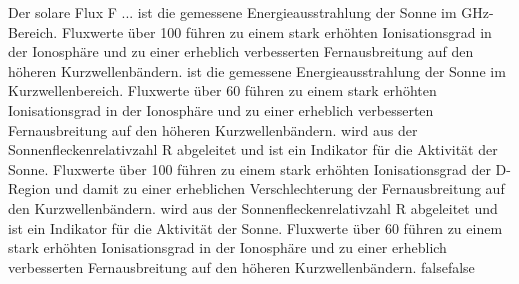     {Der solare Flux F ...}
    {ist die gemessene Energieausstrahlung der Sonne im GHz-Bereich. Fluxwerte über 100 führen zu einem stark erhöhten Ionisationsgrad in der Ionosphäre und zu einer erheblich verbesserten Fernausbreitung auf den höheren Kurzwellenbändern.}
    {ist die gemessene Energieausstrahlung der Sonne im Kurzwellenbereich. Fluxwerte über 60 führen zu einem stark erhöhten Ionisationsgrad in der Ionosphäre und zu einer erheblich verbesserten Fernausbreitung auf den höheren Kurzwellenbändern.}
    {wird aus der Sonnenfleckenrelativzahl R abgeleitet und ist ein Indikator für die Aktivität der Sonne. Fluxwerte über 100 führen zu einem stark erhöhten Ionisationsgrad der D-Region und damit zu einer erheblichen Verschlechterung der Fernausbreitung auf den Kurzwellenbändern.}
    {wird aus der Sonnenfleckenrelativzahl R abgeleitet und ist ein Indikator für die Aktivität der Sonne. Fluxwerte über 60 führen zu einem stark erhöhten Ionisationsgrad in der Ionosphäre und zu einer erheblich verbesserten Fernausbreitung auf den höheren Kurzwellenbändern.}
    {false}{false}